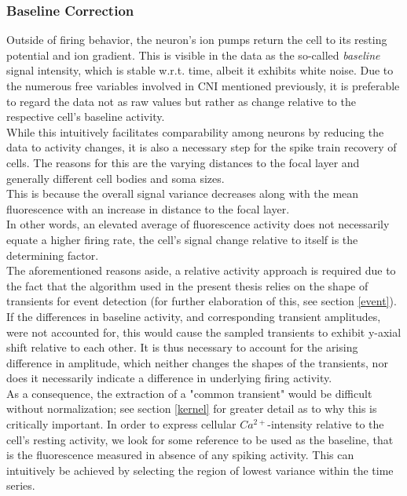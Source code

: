 \documentclass[titlepage]{article}
\begin{document}
\subsubsection{Baseline Correction} \label{base}
Outside of firing behavior, the neuron's ion pumps return the cell to its resting potential and ion gradient. This is visible in the data as the so-called \emph{baseline} signal intensity, which is stable w.r.t. time, albeit it exhibits white noise.
Due to the numerous free variables involved in CNI mentioned previously, it is preferable to regard the data not as raw values but rather as change relative to the respective cell's baseline activity.\\
While this intuitively facilitates comparability among neurons by reducing the data to activity changes, it is also a necessary step for the spike train recovery of cells. The reasons for this are the varying distances to the focal layer and generally different cell bodies and soma sizes.\\
This is because the overall signal variance decreases along with the mean fluorescence with an increase in distance to the focal layer.\cite{mukamel_automated_2009}\\
In other words, an elevated average of fluorescence activity does not necessarily equate a higher firing rate, the cell's signal change relative to itself is the determining factor.\cite{yaksi_reconstruction_2006}\\
The aforementioned reasons aside, a relative activity approach is required due to the fact that the algorithm used in the present thesis relies on the shape of transients for event detection (for further elaboration of this, see section \ref{event}).
If the differences in baseline activity, and corresponding transient amplitudes, were not accounted for, this would cause the sampled transients to exhibit y-axial shift relative to each other.
It is thus necessary to account for the arising difference in amplitude, which neither changes the shapes of the transients, nor does it necessarily indicate a difference in  underlying firing activity.\\
As a consequence, the extraction of a "common transient" would be difficult without normalization; see section \ref{kernel} for greater detail as to why this is critically important. 
In order to express cellular $Ca^{2+}$-intensity relative to the cell's resting activity, we look for some reference to be used as the baseline, that is the fluorescence measured in absence of any spiking activity.
This can intuitively be achieved by selecting the region of lowest variance within the time series. \\
\end{document}
